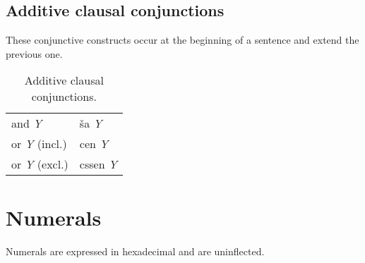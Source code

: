 \documentclass{book}
\begin{document}
\section{Additive clausal conjunctions}

These conjunctive constructs occur at the beginning of a sentence and extend the previous one.

\begin{table}[ht]
  \caption{Additive clausal conjunctions.}
  \centering
	\begin{tabular}{|l|l|}
	  \hline
	  and \emph{Y} & ša \emph{Y} \\
	  or \emph{Y} (incl.) & cen \emph{Y} \\
	  or \emph{Y} (excl.) & cssen \emph{Y} \\ \hline
	\end{tabular}
\end{table}


\chapter{Numerals}

Numerals are expressed in hexadecimal and are uninflected.
\end{document}

